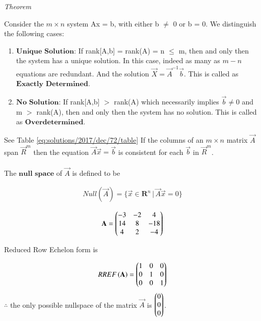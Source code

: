 	{\em Theorem}
	
	\begin{theorem}\label{eq:solutions/2017/dec/72/thm1}
		Consider the $m\times n$ system Ax = b, with either b $\neq$ 0 or b = 0. We distinguish the following cases:
		\begin{enumerate}
			\item $\textbf{Unique Solution}$: If rank[A,b] = rank(A) = n $\leq$ m, then and only then the system has a unique solution. In this case, indeed as many as $m-n$ equations are redundant. And the solution $\vec{X} = {\vec{A}^{-1}\vec{b}}$. This is called as $\textbf{Exactly Determined}$.
			\item $\textbf{No Solution}$: If rank[A,b] $>$ rank(A) which necessarily implies $\Vec{b} \neq 0$ and m $>$ rank(A), then and only then the system has no solution. This is called as $\textbf{Overdetermined}$.
		\end{enumerate}
	\end{theorem}
See Table \ref{eq:solutions/2017/dec/72/table}
%	
		If the columns of an $m\times n$ matrix $\Vec{A}$ span $\vec{R}^{m}$ then the equation $\vec{A}\vec{x}=\vec{b}$ is consistent for each $\Vec{b}$ in $\vec{R}^{m}$. \\ \\
	The $\textbf{null space}$ of $\vec{A}$ is defined to be 
	
	\begin{align}\label{eq:solutions/2017/dec/72/eq1}
		Null(\vec{A}) = \{ \vec{x} \in \mathbf{R}^{n} \, \vert \, \vec{A}\vec{x} = 0 \}
	\end{align}
%	
	
	\begin{align} \label{eq:solutions/2017/dec/72/eq2}
		\mathbf{A} = \begin{pmatrix}-3&-2&4 \\ 14&8&-18 \\ 4&2&-4\end{pmatrix}
	\end{align}
	
	Reduced Row Echelon form is
	
	\begin{align}
		RREF\left(\mathbf{A}\right) = \begin{pmatrix}1&0&0 \\ 0&1&0 \\ 0&0&1\end{pmatrix}
	\end{align}
	$\therefore$ the only possible nullspace of the matrix $\vec{A}$ is $\begin{pmatrix}0\\0\\0\end{pmatrix}$.\\
	
